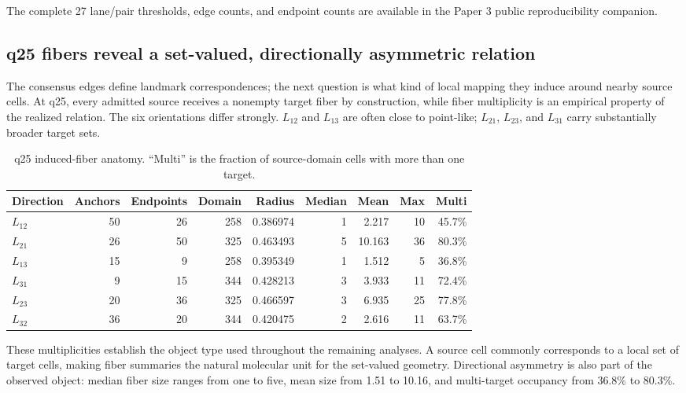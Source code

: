 \documentclass[11pt]{article}
\begin{document}
The complete 27 lane/pair thresholds, edge counts, and endpoint counts are available in the Paper 3 public reproducibility companion.



\subsection{q25 fibers reveal a set-valued, directionally asymmetric relation}

The consensus edges define landmark correspondences; the next question is what kind of local mapping they induce around nearby source cells. At q25, every admitted source receives a nonempty target fiber by construction, while fiber multiplicity is an empirical property of the realized relation. The six orientations differ strongly. \(L_{12}\) and \(L_{13}\) are often close to point-like; \(L_{21}\), \(L_{23}\), and \(L_{31}\) carry substantially broader target sets.

\begin{table}[H]
\centering
\scriptsize
\setlength{\tabcolsep}{3.2pt}
\caption{q25 induced-fiber anatomy. ``Multi'' is the fraction of source-domain cells with more than one target.}
\label{tab:fibers}
\begin{tabular}{@{}lrrrrrrrr@{}}
\toprule
Direction & Anchors & Endpoints & Domain & Radius & Median & Mean & Max & Multi\\
\midrule
\(L_{12}\)&50&26&258&0.386974&1&2.217&10&45.7\%\\
\(L_{21}\)&26&50&325&0.463493&5&10.163&36&80.3\%\\
\(L_{13}\)&15&9&258&0.395349&1&1.512&5&36.8\%\\
\(L_{31}\)&9&15&344&0.428213&3&3.933&11&72.4\%\\
\(L_{23}\)&20&36&325&0.466597&3&6.935&25&77.8\%\\
\(L_{32}\)&36&20&344&0.420475&2&2.616&11&63.7\%\\
\bottomrule
\end{tabular}
\end{table}

These multiplicities establish the object type used throughout the remaining analyses. A source cell commonly corresponds to a local set of target cells, making fiber summaries the natural molecular unit for the set-valued geometry. Directional asymmetry is also part of the observed object: median fiber size ranges from one to five, mean size from 1.51 to 10.16, and multi-target occupancy from 36.8\% to 80.3\%.
\end{document}
